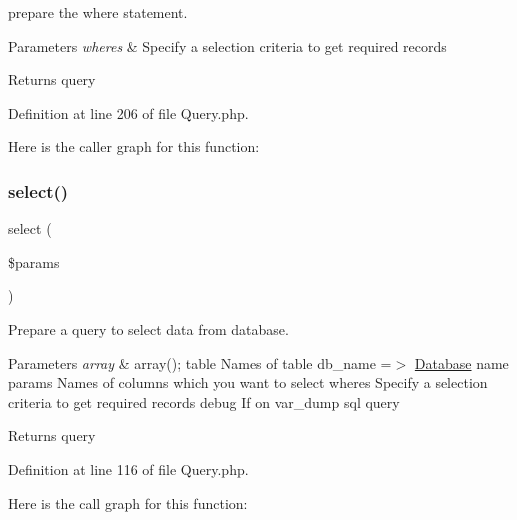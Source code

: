prepare the where statement.


\begin{DoxyParams}{Parameters}
{\em \textquotesingle{}wheres\textquotesingle{}} & Specify a selection criteria to get required records\\
\hline
\end{DoxyParams}
\begin{DoxyReturn}{Returns}
query 
\end{DoxyReturn}


Definition at line 206 of file Query.\+php.

Here is the caller graph for this function\+:
\mbox{\label{class_zest_1_1_database_1_1_query_1_1_query_aaade19290861bb3abf902bb14a51889b}} 
\subsubsection{\texorpdfstring{select()}{select()}}
{\footnotesize\ttfamily select (\begin{DoxyParamCaption}\item[{}]{\$params }\end{DoxyParamCaption})}

Prepare a query to select data from database.


\begin{DoxyParams}{Parameters}
{\em array} & array(); \textquotesingle{}table\textquotesingle{} Names of table \textquotesingle{}db\+\_\+name\textquotesingle{} =$>$ \mbox{\hyperlink{namespace_zest_1_1_database}{Database}} name \textquotesingle{}params\textquotesingle{} Names of columns which you want to select \textquotesingle{}wheres\textquotesingle{} Specify a selection criteria to get required records \textquotesingle{}debug\textquotesingle{} If on var\+\_\+dump sql query\\
\hline
\end{DoxyParams}
\begin{DoxyReturn}{Returns}
query 
\end{DoxyReturn}


Definition at line 116 of file Query.\+php.

Here is the call graph for this function\+:
\mbox{\label{class_zest_1_1_database_1_1_query_1_1_query_aacfc8ca52b10f139be3398f374cd01cb}} 
